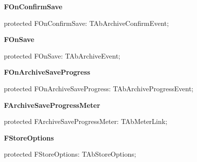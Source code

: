 \documentclass{report}
\newif\ifpdf
\begin{document}
\begin{list}{}
\begin{flushleft}
\ifpdf
\end{flushleft}
\fi


\par  \label{AbZipper.TAbCustomZipper-FOnConfirmSave}
\item[\textbf{FOnConfirmSave}\hfill]
\ifpdf
\begin{flushleft}
\fi
\begin{ttfamily}
protected FOnConfirmSave: TAbArchiveConfirmEvent;\end{ttfamily}

\ifpdf
\end{flushleft}
\fi


\par  \label{AbZipper.TAbCustomZipper-FOnSave}
\item[\textbf{FOnSave}\hfill]
\ifpdf
\begin{flushleft}
\fi
\begin{ttfamily}
protected FOnSave: TAbArchiveEvent;\end{ttfamily}

\ifpdf
\end{flushleft}
\fi


\par  \label{AbZipper.TAbCustomZipper-FOnArchiveSaveProgress}
\item[\textbf{FOnArchiveSaveProgress}\hfill]
\ifpdf
\begin{flushleft}
\fi
\begin{ttfamily}
protected FOnArchiveSaveProgress: TAbArchiveProgressEvent;\end{ttfamily}

\ifpdf
\end{flushleft}
\fi


\par  \label{AbZipper.TAbCustomZipper-FArchiveSaveProgressMeter}
\item[\textbf{FArchiveSaveProgressMeter}\hfill]
\ifpdf
\begin{flushleft}
\fi
\begin{ttfamily}
protected FArchiveSaveProgressMeter: TAbMeterLink;\end{ttfamily}

\ifpdf
\end{flushleft}
\fi


\par  \label{AbZipper.TAbCustomZipper-FStoreOptions}
\item[\textbf{FStoreOptions}\hfill]
\ifpdf
\begin{flushleft}
\fi
\begin{ttfamily}
protected FStoreOptions: TAbStoreOptions;\end{ttfamily}

\ifpdf
\end{flushleft}
\fi


\par  \end{list}
\end{document}
